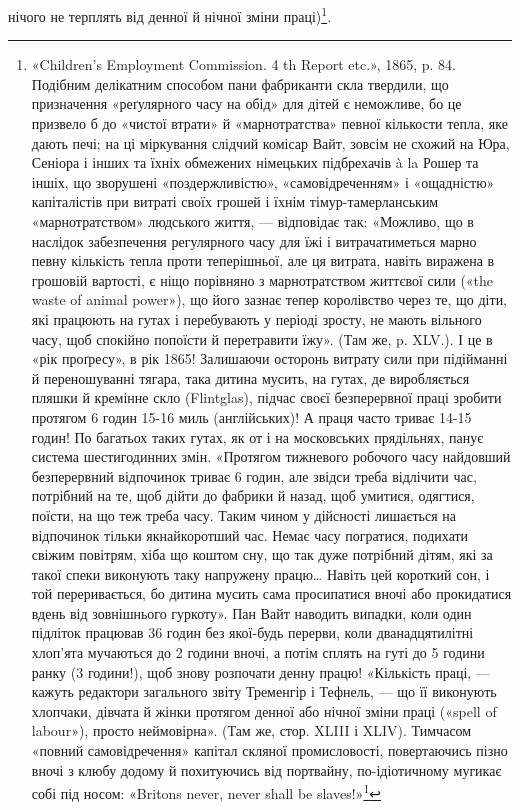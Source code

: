 нічого не терплять від денної й нічної зміни праці)\footnote{
«Children’s Employment Commission. 4 th Report etc.», 1865,
p. 84. Подібним делікатним способом пани фабриканти скла твердили, що
призначення «реґулярного часу на обід» для дітей є неможливе, бо це
призвело б до «чистої втрати» й «марнотратства» певної кількости тепла,
яке дають печі; на ці міркування слідчий комісар Вайт, зовсім не схожий
на Юра, Сеніора і інших та їхніх обмежених німецьких підбрехачів à la
Рошер та іншіх, що зворушені «поздержливістю», «самовідреченням» і
«ощадністю» капіталістів при витраті своїх грошей і їхнім тімур-тамерланським
«марнотратством» людського життя, — відповідає так: «Можливо,
що в наслідок забезпечення регулярного часу для їжі і витрачатиметься
марно певну кількість тепла проти теперішньої, але ця витрата,
навіть виражена в грошовій вартості, є ніщо порівняно з марнотратством
життєвої сили («the waste of animal power»), що його зазнає тепер королівство
через те, що діти, які працюють на гутах і перебувають у періоді
зросту, не мають вільного часу, щоб спокійно попоїсти й перетравити
їжу». (Там же, p. XLV.). І це в «рік проґресу», в рік 1865! Залишаючи
осторонь витрату сили при підійманні й переношуванні тягара, така
дитина мусить, на гутах, де виробляється пляшки й кремінне скло (Flintglas),
підчас своєї безперервної праці зробити протягом 6 годин 15-16
миль (англійських)! А праця часто триває 14-15 годин! По багатьох
таких гутах, як от і на московських прядільнях, панує система шестигодинних
змін. «Протягом тижневого робочого часу найдовший безперервний
відпочинок триває 6 годин, але звідси треба відлічити час, потрібний на
те, щоб дійти до фабрики й назад, щоб умитися, одягтися, поїсти, на що
теж треба часу. Таким чином у дійсності лишається на відпочинок тільки
якнайкоротший час. Немає часу погратися, подихати свіжим повітрям,
хіба що коштом сну, що так дуже потрібний дітям, які за такої спеки
виконують таку напружену працю\dots{} Навіть цей короткий сон, і той переривається,
бо дитина мусить сама просипатися вночі або прокидатися вдень
від зовнішнього гуркоту». Пан Вайт наводить випадки, коли один підліток
працював 36 годин без якої-будь перерви, коли дванадцятилітні хлоп’ята
мучаються до 2 години вночі, а потім сплять на гуті до 5 години ранку
(3 години!), щоб знову розпочати денну працю! «Кількість праці, — кажуть
редактори загального звіту Тременгір і Тефнель, — що її виконують
хлопчаки, дівчата й жінки протягом денної або нічної зміни праці («spell of
labour»), просто неймовірна». (Там же, стор. XLIII і XLIV). Тимчасом
«повний самовідречення» капітал скляної промисловості, повертаючись
пізно вночі з клюбу додому й похитуючись від портвайну, по-ідіотичному
мугикає собі під носом: «Britons never, never shall be slaves!»\footnote*{
Ніколи, ніколи британці не будуть рабами. \emph{Ред.}}
}.

